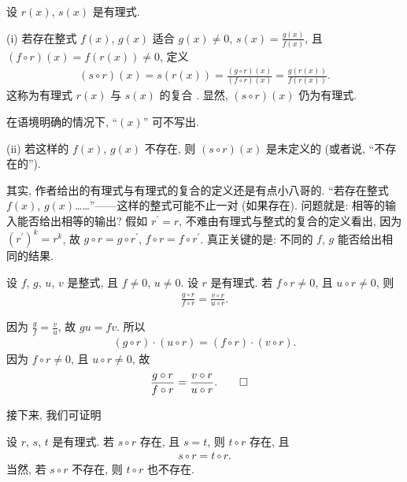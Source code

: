 \begin{definition}
    设 $r(x)$, $s(x)$ 是有理式.

    (i) 若存在整式 $f(x)$, $g(x)$ 适合 $g(x) \neq 0$, $s(x) = \frac{g(x)}{f(x)}$, 且 $(f \circ r)(x) = f(r(x)) \neq 0$, 定义
    \begin{align*}
        (s \circ r)(x) = s(r(x)) = \frac{(g \circ r)(x)}{(f \circ r)(x)} = \frac{g(r(x))}{f(r(x))}.
    \end{align*}
    这称为有理式 $r(x)$ 与 $s(x)$ 的复合 . 显然, $(s \circ r)(x)$ 仍为有理式.

    在语境明确的情况下, ``$(x)$'' 可不写出.

    (ii) 若这样的 $f(x)$, $g(x)$ 不存在, 则 $(s \circ r)(x)$ 是未定义的 (或者说, ``不存在的'').
\end{definition}

其实, 作者给出的有理式与有理式的复合的定义还是有点小八哥的. ``若存在整式 $f(x)$, $g(x)$……''——这样的整式可能不止一对 (如果存在). 问题就是: 相等的输入能否给出相等的输出? 假如 $r^{\prime} = r$, 不难由有理式与整式的复合的定义看出, 因为 $(r^{\prime})^k = r^k$, 故 $g \circ r = g \circ r^{\prime}$, $f \circ r = f \circ r^{\prime}$. 真正关键的是: 不同的 $f$, $g$ 能否给出相同的结果.

\begin{proposition}
    设 $f$, $g$, $u$, $v$ 是整式, 且 $f \neq 0$, $u \neq 0$. 设 $r$ 是有理式. 若 $f \circ r \neq 0$, 且 $u \circ r \neq 0$, 则
    \begin{align*}
        \frac{g \circ r}{f \circ r} = \frac{v \circ r}{u \circ r}.
    \end{align*}
\end{proposition}

\begin{pf}
    因为 $\frac{g}{f} = \frac{v}{u}$, 故 $gu = fv$. 所以
    \begin{align*}
        (g \circ r) \cdot (u \circ r) = (f \circ r) \cdot (v \circ r).
    \end{align*}
    因为 $f \circ r \neq 0$, 且 $u \circ r \neq 0$, 故
    \begin{align*}
         & \frac{g \circ r}{f \circ r} = \frac{v \circ r}{u \circ r}. \qedhere
    \end{align*}
\end{pf}

接下来, 我们可证明
\begin{proposition}
    设 $r$, $s$, $t$ 是有理式. 若 $s \circ r$ 存在, 且 $s = t$, 则 $t \circ r$ 存在, 且
    \begin{align*}
        s \circ r = t \circ r.
    \end{align*}
    当然, 若 $s \circ r$ 不存在, 则 $t \circ r$ 也不存在.
\end{proposition}

